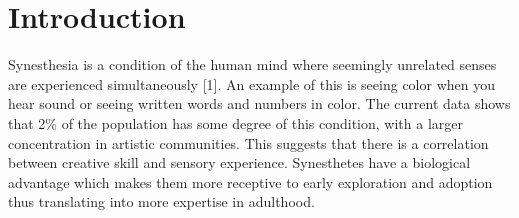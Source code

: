 \documentclass{sigchi}
\begin{document}
\section{Introduction}

Synesthesia is a condition of the human mind where seemingly unrelated senses are experienced simultaneously [1]. An example of this is seeing color when you hear sound or seeing written words and numbers in color. The current data shows that 2\% of the population has some degree of this condition, with a larger concentration in artistic communities. This suggests that there is a correlation between creative skill and sensory experience. Synesthetes have a biological advantage which makes them more receptive to early exploration and adoption thus translating into more expertise in adulthood.






\end{document}
